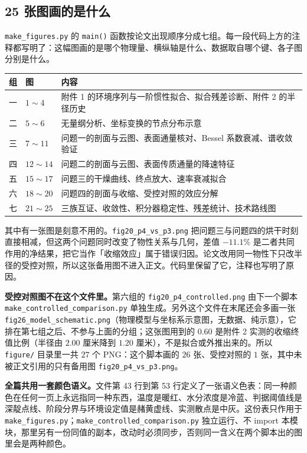 \subsection{25 张图画的是什么}

\texttt{make\_figures.py} 的 \texttt{main()} 函数按论文出现顺序分成七组。每一段代码上方的注释都写明了：这幅图画的是哪个物理量、横纵轴是什么、数据取自哪个键、各子图分别是什么。

\begin{center}
\begin{tabular}{@{}clp{8.2cm}@{}}
\toprule
组 & 图 & 内容 \\
\midrule
一 & $1\sim4$ & 附件 1 的环境序列与一阶惯性拟合、拟合残差诊断、附件 2 的半径历史 \\
二 & $5\sim6$ & 无量纲分析、坐标变换的节点分布示意 \\
三 & $7\sim11$ & 问题一的剖面与云图、表面通量核对、Bessel 系数衰减、谱收敛验证 \\
四 & $12\sim14$ & 问题二的剖面与云图、表面传质通量的降速特征 \\
五 & $15\sim17$ & 问题三的干燥曲线、终点放大、速率衰减拟合 \\
六 & $18\sim20$ & 问题四的剖面与收缩、受控对照的效应分解 \\
七 & $21\sim25$ & 三族互证、收敛性、积分器稳定性、残差统计、技术路线图 \\
\bottomrule
\end{tabular}
\end{center}

其中有一张图是刻意不用的。\texttt{fig20\_p4\_vs\_p3.png} 把问题三与问题四的烘干时刻直接相减，但这两个问题同时改变了物性关系与几何，差值 $-11.1\%$ 是二者共同作用的净结果，把它当作「收缩效应」属于错误归因。论文改用同一物性下只改半径的受控对照，所以这张备用图不进入正文。代码里保留了它，注释也写明了原因。

\textbf{受控对照图不在这个文件里。}第六组的 \texttt{fig20\_p4\_controlled.png} 由下一个脚本 \texttt{make\_controlled\_comparison.py} 单独生成。另外这个文件在末尾还会多画一张 \texttt{fig26\_model\_schematic.png}（物理模型与坐标系示意图，无数据、纯示意），它排在第七组之后、不参与上面的分组；这张图用到的 $0.60$ 是附件 2 实测的收缩终值比例（半径由 $2.00$ 厘米降到 $1.20$ 厘米），不是拟合或外推出来的。所以 \texttt{figure/} 目录里一共 $27$ 个 PNG：这个脚本画的 $26$ 张、受控对照的 $1$ 张，其中未被正文引用的只有备用图 \texttt{fig20\_p4\_vs\_p3.png}。

\textbf{全篇共用一套颜色语义。}文件第 43 行到第 53 行定义了一张语义色表：同一种颜色在任何一页上永远指同一种东西，温度是暖红、水分浓度是冷蓝、判据阈值线是深靛点线、阶段分界与环境设定值是赭黄虚线、实测散点是中灰。这份表只作用于 \texttt{make\_figures.py}；\texttt{make\_controlled\_comparison.py} 独立运行、不 import 本模块，那里另有一份同值的副本，改动时必须同步，否则同一含义在两个脚本出的图里会是两种颜色。

